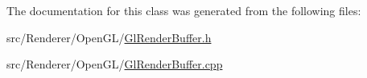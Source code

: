 The documentation for this class was generated from the following files\+:\begin{DoxyCompactItemize}
\item 
src/\+Renderer/\+Open\+G\+L/\hyperlink{_gl_render_buffer_8h}{Gl\+Render\+Buffer.\+h}\item 
src/\+Renderer/\+Open\+G\+L/\hyperlink{_gl_render_buffer_8cpp}{Gl\+Render\+Buffer.\+cpp}\end{DoxyCompactItemize}
